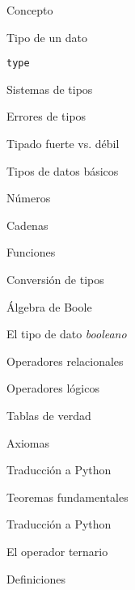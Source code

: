 \begin{longenum}
\begin{longenum}
\begin{longenum}
            \item Concepto
            \item Tipo de un dato
            \item \texttt{type}
            \item Sistemas de tipos
            \begin{longenum}
                \item Errores de tipos
                \item Tipado fuerte vs. débil
            \end{longenum}
            \item Tipos de datos básicos
            \begin{longenum}
                \item Números
                \item Cadenas
                \item Funciones
            \end{longenum}
            \item Conversión de tipos
        \end{longenum}
        \item Álgebra de Boole
        \begin{longenum}
            \item El tipo de dato \textit{booleano}
            \item Operadores relacionales
            \item Operadores lógicos
            \begin{longenum}
                \item Tablas de verdad
            \end{longenum}
            \item Axiomas
            \begin{longenum}
                \item Traducción a Python
            \end{longenum}
            \item Teoremas fundamentales
            \begin{longenum}
                \item Traducción a Python
            \end{longenum}
            \item El operador ternario
        \end{longenum}
        \item Definiciones
        \begin{longenum}

\end{longenum}
\end{longenum}
\end{longenum}
